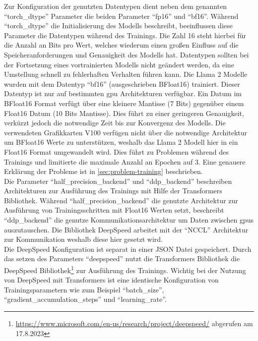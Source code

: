 Zur Konfiguration der genutzten Datentypen dient neben dem genannten \enquote{torch\_dtype} Parameter die beiden Parameter \enquote{fp16} und \enquote{bf16}. Während \enquote{torch\_dtype} die Initialisierung des Modells beschreibt, beeinflussen diese Parameter die Datentypen während des Trainings.
Die Zahl 16 steht hierbei für die Anzahl an Bits pro Wert, welches wiederum einen großen Einfluss auf die Speicheranforderungen und Genauigkeit des Modells hat.
Datentypen sollten bei der Fortsetzung eines vortrainierten Modells nicht geändert werden, da eine Umstellung schnell zu fehlerhaften Verhalten führen kann.
Die Llama 2 Modelle wurden mit dem Datentyp \enquote{bf16} (ausgeschrieben BFloat16) trainiert.
Dieser Datentyp ist nur auf bestimmten \ac{gpu} Architekturen verfügbar.
Ein Datum im BFloat16 Format verfügt über eine kleinere Mantisse (7 Bits) gegenüber einem Float16 Datum (10 Bits Mantisse). Dies führt zu einer geringeren Genauigkeit, verkürzt jedoch die notwendige Zeit bis zur Konvergenz des Modells.
Die verwendeten Grafikkarten V100 verfügen nicht über die notwendige Architektur um BFloat16 Werte zu unterstützen, weshalb das Llama 2 Modell hier in ein Float16 Format umgewandelt wird.
Dies führt zu Problemen während des Trainings und limitierte die maximale Anzahl an Epochen auf 3. Eine genauere Erklärung der Probleme ist in \cref{sec:problem-training} beschrieben.\\

Die Parameter \enquote{half\_precision\_backend} und \enquote{ddp\_backend} beschreiben Architekturen zur Ausführung des Trainings mit Hilfe der Transformers Bibliothek.
Während \enquote{half\_precision\_backend} die genutzte Architektur zur Ausführung von Trainingsschritten mit Float16 Werten setzt, beschreibt \enquote{ddp\_backend} die genutze Kommunikationsarchitektur um Daten zwischen \ac{gpu}s auszutauschen.
Die Bibliothek DeepSpeed arbeitet mit der \enquote{NCCL} Architektur zur Kommunikation weshalb diese hier gesetzt wird.\\

Die DeepSpeed Konfiguration ist separat in einer JSON Datei gespeichert.
Durch das setzen des Parameters \enquote{deepspeed} nutzt die Transformers Bibliothek die DeepSpeed Bibliothek\footnote{\url{https://www.microsoft.com/en-us/research/project/deepspeed/} abgerufen am 17.8.2023} zur Ausführung des Trainings.
Wichtig bei der Nutzung von DeepSpeed mit Transformers ist eine identische Konfiguration von Trainingsparametern wie zum Beispiel \enquote{batch\_size}, \enquote{gradient\_accumulation\_steps} und \enquote{learning\_rate}.\\


